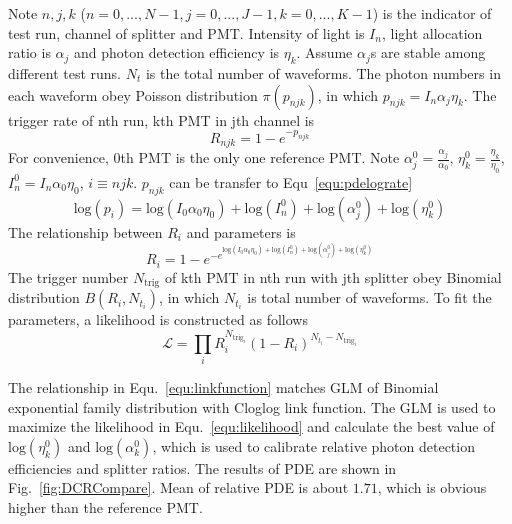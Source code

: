 Note $n,j,k$ ($n=0,...,N-1, j=0,...,J-1, k=0,...,K-1$) is the indicator of test run, channel of splitter and PMT. Intensity of light is $I_n$, light allocation ratio is $\alpha_j$ and photon detection efficiency is $\eta_k$. Assume $\alpha_j$s are stable among different test runs. $N_t$ is the total number of waveforms. The photon numbers in each waveform obey Poisson distribution $\pi(p_{njk})$, in which $p_{njk}=I_n\alpha_j\eta_k$. The trigger rate of nth run, kth PMT in jth channel is
\begin{equation}
    \label{equ:pderate}
    R_{njk}=1-e^{-p_{njk}}
\end{equation}
For convenience, 0th PMT is the only one reference PMT. Note $\alpha_j^0=\frac{\alpha_j}{\alpha_0}$, $\eta_k^0=\frac{\eta_k}{\eta_0}$, $I_n^0=I_n\alpha_0\eta_0$, $i\equiv njk$. $p_{njk}$ can be transfer to Equ~\eqref{equ:pdelograte}
\begin{equation}
    \label{equ:pdelograte}
    \mathrm{log}(p_{i})=\mathrm{log}(I_0\alpha_0\eta_0)+\mathrm{log}(I_n^0)+\mathrm{log}(\alpha_j^0)+\mathrm{log}(\eta_k^0)
\end{equation}
The relationship between $R_{i}$ and parameters is
\begin{equation}
    \label{equ:linkfunction}
    R_{i}=1-e^{-e^{\mathrm{log}(I_0\alpha_0\eta_0)+\mathrm{log}(I_n^0)+\mathrm{log}(\alpha_j^0)+\mathrm{log}(\eta_k^0)}}
\end{equation}
The trigger number $N_{\mathrm{trig}}$ of kth PMT in nth run with jth splitter obey Binomial distribution $B(R_{i},N_{t_{i}})$, in which $N_{t_{i}}$ is total number of waveforms. To fit the parameters, a likelihood is constructed as follows
\begin{equation}
    \label{equ:likelihood}
    \mathcal{L}=\prod_{i}{R_{i}^{N_{\mathrm{trig}_{i}}}(1-R_{i})^{N_{t_{i}}-N_{\mathrm{trig}_{i}}}}
\end{equation}

The relationship in Equ.~\eqref{equ:linkfunction} matches GLM of Binomial exponential family distribution with Cloglog link function\cite{glm}. The GLM is used to maximize the likelihood in Equ.~\eqref{equ:likelihood} and calculate the best value of $\mathrm{log}(\eta_k^0)$ and $\mathrm{log}(\alpha_k^0)$, which is used to calibrate relative photon detection efficiencies and splitter ratios. The results of PDE are shown in Fig.~\ref{fig:DCRCompare}. Mean of relative PDE is about $1.71$, which is obvious higher than the reference PMT.

